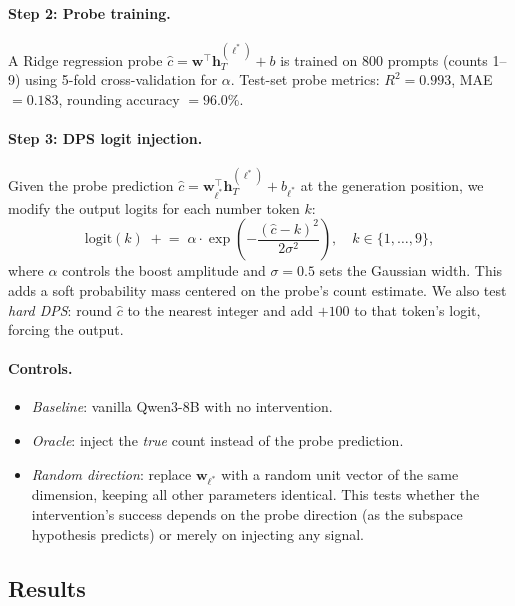 \documentclass{article}
\begin{document}
\paragraph{Step 2: Probe training.}
A Ridge regression probe $\hat{c} = \mathbf{w}^\top \mathbf{h}^{(\ell^*)}_T + b$
is trained on 800 prompts (counts 1--9) using 5-fold cross-validation for $\alpha$.
Test-set probe metrics: $R^2 = 0.993$, MAE $= 0.183$, rounding accuracy $= 96.0\%$.

\paragraph{Step 3: DPS logit injection.}
Given the probe prediction $\hat{c} = \mathbf{w}_{\ell^*}^\top \mathbf{h}^{(\ell^*)}_T + b_{\ell^*}$
at the generation position, we modify the output logits for each number token $k$:
\begin{equation}
  \text{logit}(k) \;\mathrel{+}=\; \alpha \cdot \exp\!\left(-\frac{(\hat{c} - k)^2}{2\sigma^2}\right),
  \quad k \in \{1, \ldots, 9\},
  \label{eq:dps}
\end{equation}
where $\alpha$ controls the boost amplitude and $\sigma = 0.5$ sets the Gaussian width.
This adds a soft probability mass centered on the probe's count estimate.
We also test \emph{hard DPS}: round $\hat{c}$ to the nearest integer and add $+100$
to that token's logit, forcing the output.

\paragraph{Controls.}
\begin{itemize}
  \item \emph{Baseline}: vanilla Qwen3-8B with no intervention.
  \item \emph{Oracle}: inject the \emph{true} count instead of the probe prediction.
  \item \emph{Random direction}: replace $\mathbf{w}_{\ell^*}$ with a random unit vector
    of the same dimension, keeping all other parameters identical.
    This tests whether the intervention's success depends on the probe direction
    (as the subspace hypothesis predicts) or merely on injecting any signal.
\end{itemize}

\subsection{Results}
\label{sec:dps_results}
\end{document}
